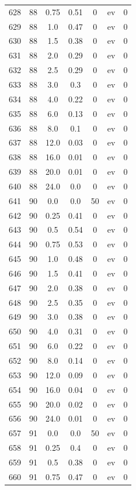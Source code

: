 \documentclass[12pt,a4paper]{article}
\begin{document}
\begin{tabular}{r|cccccc}
	628 & 88 & 0.75 & 0.51 & 0 & ev & 0 \\
	629 & 88 & 1.0 & 0.47 & 0 & ev & 0 \\
	630 & 88 & 1.5 & 0.38 & 0 & ev & 0 \\
	631 & 88 & 2.0 & 0.29 & 0 & ev & 0 \\
	632 & 88 & 2.5 & 0.29 & 0 & ev & 0 \\
	633 & 88 & 3.0 & 0.3 & 0 & ev & 0 \\
	634 & 88 & 4.0 & 0.22 & 0 & ev & 0 \\
	635 & 88 & 6.0 & 0.13 & 0 & ev & 0 \\
	636 & 88 & 8.0 & 0.1 & 0 & ev & 0 \\
	637 & 88 & 12.0 & 0.03 & 0 & ev & 0 \\
	638 & 88 & 16.0 & 0.01 & 0 & ev & 0 \\
	639 & 88 & 20.0 & 0.01 & 0 & ev & 0 \\
	640 & 88 & 24.0 & 0.0 & 0 & ev & 0 \\
	641 & 90 & 0.0 & 0.0 & 50 & ev & 0 \\
	642 & 90 & 0.25 & 0.41 & 0 & ev & 0 \\
	643 & 90 & 0.5 & 0.54 & 0 & ev & 0 \\
	644 & 90 & 0.75 & 0.53 & 0 & ev & 0 \\
	645 & 90 & 1.0 & 0.48 & 0 & ev & 0 \\
	646 & 90 & 1.5 & 0.41 & 0 & ev & 0 \\
	647 & 90 & 2.0 & 0.38 & 0 & ev & 0 \\
	648 & 90 & 2.5 & 0.35 & 0 & ev & 0 \\
	649 & 90 & 3.0 & 0.38 & 0 & ev & 0 \\
	650 & 90 & 4.0 & 0.31 & 0 & ev & 0 \\
	651 & 90 & 6.0 & 0.22 & 0 & ev & 0 \\
	652 & 90 & 8.0 & 0.14 & 0 & ev & 0 \\
	653 & 90 & 12.0 & 0.09 & 0 & ev & 0 \\
	654 & 90 & 16.0 & 0.04 & 0 & ev & 0 \\
	655 & 90 & 20.0 & 0.02 & 0 & ev & 0 \\
	656 & 90 & 24.0 & 0.01 & 0 & ev & 0 \\
	657 & 91 & 0.0 & 0.0 & 50 & ev & 0 \\
	658 & 91 & 0.25 & 0.4 & 0 & ev & 0 \\
	659 & 91 & 0.5 & 0.38 & 0 & ev & 0 \\
	660 & 91 & 0.75 & 0.47 & 0 & ev & 0 \\

\end{tabular}
\end{document}

